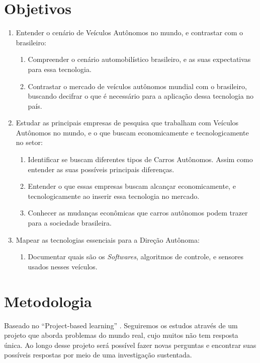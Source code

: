 
\chapter[Objetivos]{Objetivos}
\begin{enumerate}
  \item  Entender o cenário de Veículos Autônomos no mundo, e contrastar com o brasileiro:
        \begin{enumerate}
          \item Compreender o cenário automobilístico brasileiro, e as suas expectativas para essa tecnologia.
          \item Contrastar o mercado de veículos autônomos mundial com o brasileiro, buscando  decifrar o que é necessário para a aplicação dessa tecnologia no país.
        \end{enumerate}
  \item  Estudar as principais empresas de pesquisa que trabalham com Veículos Autônomos no mundo, e o que buscam economicamente e tecnologicamente no setor:
        \begin{enumerate}
          \item Identificar se buscam diferentes tipos de Carros Autônomos. Assim como entender as suas possíveis principais diferenças.
          \item Entender o que essas empresas buscam alcançar economicamente, e tecnologicamente ao inserir essa tecnologia no mercado.
          \item Conhecer as mudanças econômicas que carros autônomos podem trazer para a sociedade brasileira.
        \end{enumerate}
  \item Mapear as tecnologias essenciais para a Direção Autônoma:
        \begin{enumerate}
          \item Documentar quais são os \textit{Softwares}, algoritmos de controle, e sensores usados nesses veículos.
        \end{enumerate}
\end{enumerate}

\chapter[Metodologia]{Metodologia}

Baseado no ``Project-based learning'' \cite{krajcik2006project}. Seguiremos os estudos através de um projeto que aborda problemas do mundo real, cujo muitos não tem resposta única. Ao longo desse projeto será possível fazer novas perguntas e encontrar suas possíveis respostas por meio de uma investigação sustentada.

